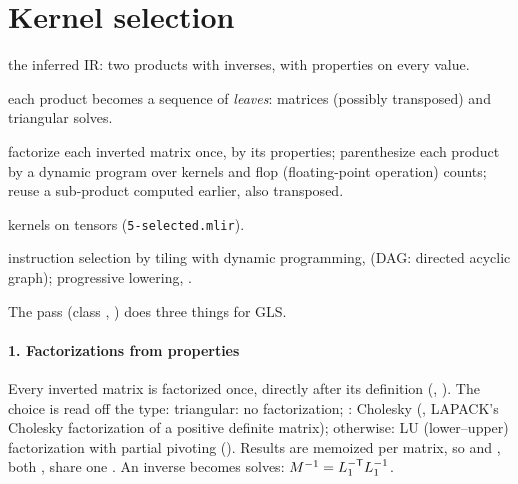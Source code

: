 \section{Kernel selection}
\label{sec:gls-select}

\begin{steps}
\item[Input] the inferred IR: two products with inverses, with properties on every value.
\item[Representation] each product becomes a sequence of \emph{leaves}: matrices (possibly transposed) and triangular solves.
\item[Rule] factorize each inverted matrix once, by its properties; parenthesize each product by a dynamic program over kernels and flop (floating-point operation) counts; reuse a sub-product computed earlier, also transposed.
\item[Output]  kernels on tensors (\texttt{5-selected.mlir}).
\item[Theory] instruction selection by tiling with dynamic programming,  (DAG: directed acyclic graph); progressive lowering, .
\end{steps}

The pass  (class ,
) does three things for GLS.

\paragraph{1. Factorizations from properties} Every inverted matrix is
factorized once, directly after its definition (,
). The choice is read off the type:
triangular: no factorization; : Cholesky (, LAPACK's
Cholesky factorization of a positive definite matrix); otherwise: LU (lower–upper)
factorization with partial pivoting (). Results are memoized per
matrix, so  and , both , share one
. An inverse becomes solves: \(M^{-1} = L_1^{-\mathsf{T}} L_1^{-1}\).

